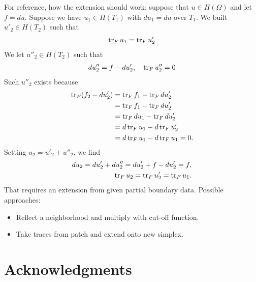 \documentclass[a4paper]{article}
\begin{document}
\begin{remark}
    For reference, how the extension should work:
    suppose that $u \in H(\Omega)$ and let $f = du$.
    Suppose we have $u_1 \in H(T_1)$ with $du_1 = du$ over $T_1$. 
    We built $u'_2 \in H(T_2)$ such that 
    \begin{align*}
        \operatorname{tr}_F u_1 = \operatorname{tr}_F u'_2
    \end{align*}
    We let $u''_2 \in H(T_2)$ such that 
    \begin{align*}
        d u''_2 = f - d u'_2, \quad \operatorname{tr}_F u''_2 = 0
    \end{align*}
    Such $u''_2$ exists because 
    \begin{align*}
        \operatorname{tr}_F( f_2 - d u'_2 ) 
        &= 
        \operatorname{tr}_F f_1 - \operatorname{tr}_F d u'_2
        \\&= 
        \operatorname{tr}_F f_1 - \operatorname{tr}_F d u'_2
        \\&= 
        \operatorname{tr}_F d u_1 - \operatorname{tr}_F d u'_2
        \\&= 
        d \operatorname{tr}_F u_1 - d \operatorname{tr}_F u'_2
        \\&= 
        d \operatorname{tr}_F u_1 - d \operatorname{tr}_F u_1
        = 0
        .
    \end{align*}
    Setting $u_2 = u'_2 + u''_2$, we find 
    \begin{align*}
        d u_2 = d u'_2 + d u''_2 = d u'_2 + f - d u'_2 = f,
        \\
        \operatorname{tr}_F u_2 = \operatorname{tr}_F u'_2 = \operatorname{tr}_F u_1.
    \end{align*}
    That requires an extension from given partial boundary data. 
    Possible approaches:
    \begin{itemize}
        \item Reflect a neighborhood and multiply with cut-off function.
        \item Take traces from patch and extend onto new simplex. 
    \end{itemize}
\end{remark}




\section*{Acknowledgments}



\end{document}
